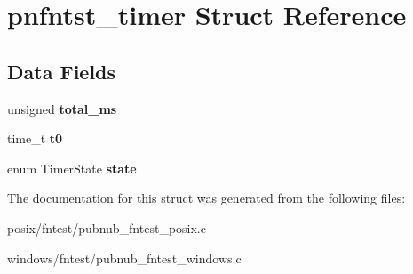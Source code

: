 \hypertarget{structpnfntst__timer}{\section{pnfntst\-\_\-timer Struct Reference}
\label{structpnfntst__timer}
}
\subsection*{Data Fields}
\begin{DoxyCompactItemize}
\item 
\hypertarget{structpnfntst__timer_a9d5088402efb1c753f8363e50a91020c}{unsigned {\bfseries total\-\_\-ms}}\label{structpnfntst__timer_a9d5088402efb1c753f8363e50a91020c}

\item 
\hypertarget{structpnfntst__timer_a006c7ccf86776d47de22b1e736b0047e}{time\-\_\-t {\bfseries t0}}\label{structpnfntst__timer_a006c7ccf86776d47de22b1e736b0047e}

\item 
\hypertarget{structpnfntst__timer_a15f097b759d9ab7b17c6f2d208b8e57f}{enum Timer\-State {\bfseries state}}\label{structpnfntst__timer_a15f097b759d9ab7b17c6f2d208b8e57f}

\end{DoxyCompactItemize}


The documentation for this struct was generated from the following files\-:\begin{DoxyCompactItemize}
\item 
posix/fntest/pubnub\-\_\-fntest\-\_\-posix.\-c\item 
windows/fntest/pubnub\-\_\-fntest\-\_\-windows.\-c\end{DoxyCompactItemize}

